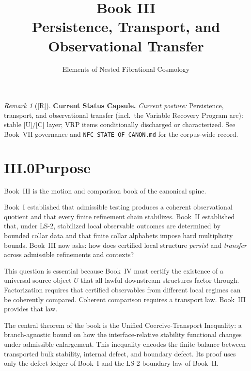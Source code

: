 \documentclass[12pt,oneside]{amsbook}
\theoremstyle{plain}
\theoremstyle{definition}
\theoremstyle{remark}
\newtheorem{remark}[theorem]{Remark}
\newcommand{\status}[1]{\textup{[#1]}}
\begin{document}
\title{Book III\\[6pt]Persistence, Transport, and Observational Transfer}
\author{Elements of Nested Fibrational Cosmology}
\date{}
\maketitle

\tableofcontents

\bigskip


\begin{remark}[\status{R}]\label{cap:book3-status}
\textbf{Current Status Capsule.} \emph{Current posture:} Persistence, transport, and observational transfer (incl.\ the Variable Recovery Program arc): stable [U]/[C] layer; VRP items conditionally discharged or characterized. See Book~VII governance and \texttt{NFC\_STATE\_OF\_CANON.md} for the corpus-wide record.
\end{remark}

\section*{III.0\quad Purpose}

Book~III is the motion and comparison book of the canonical spine.

Book~I established that admissible testing produces a coherent
observational quotient and that every finite refinement chain
stabilizes.  Book~II established that, under LS-2, stabilized local
observable outcomes are determined by bounded collar data and that
finite collar alphabets impose hard multiplicity bounds.  Book~III now
asks: how does certified local structure \emph{persist} and
\emph{transfer} across admissible refinements and contexts?

This question is essential because Book~IV must certify the existence
of a universal source object $U$ that all lawful downstream structures
factor through.  Factorization requires that certified observables from
different local regimes can be coherently compared.  Coherent
comparison requires a transport law.  Book~III provides that law.

The central theorem of the book is the Unified Coercive-Transport
Inequality: a branch-agnostic bound on how the interface-relative
stability functional changes under admissible enlargement.  This
inequality encodes the finite balance between transported bulk
stability, internal defect, and boundary defect.  Its proof uses only
the defect ledger of Book~I and the LS-2 boundary law of Book~II.
\end{document}
